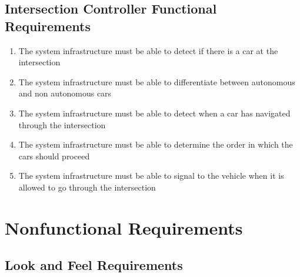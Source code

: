 \documentclass [12pt]{article}
\begin{document}
\subsection{\large Intersection Controller Functional Requirements}
\begin{enumerate}[label=\textbf{IC\arabic*:}, leftmargin=0.8in]

	\item The system infrastructure must be able to detect if there is a car at the intersection
	
	\item The system infrastructure must be able to differentiate between autonomous and non autonomous cars
	
	\item The system infrastructure must be able to detect when a car has navigated through the intersection

    \item The system infrastructure must be able to determine the order in which the cars should proceed
    
    \item The system infrastructure must be able to signal to the vehicle when it is allowed to go through the intersection
\end{enumerate}




%
%



\section {Nonfunctional Requirements} 



\subsection {\large Look and Feel Requirements}
\end{document}
